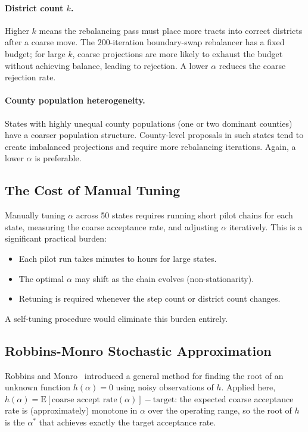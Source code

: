 \paragraph{District count $k$.}
Higher $k$ means the rebalancing pass must place more tracts into correct
districts after a coarse move.
The $200$-iteration boundary-swap rebalancer has a fixed budget; for large
$k$, coarse projections are more likely to exhaust the budget without
achieving balance, leading to rejection.
A lower $\alpha$ reduces the coarse rejection rate.

\paragraph{County population heterogeneity.}
States with highly unequal county populations (one or two dominant counties)
have a coarser population structure.
County-level proposals in such states tend to create imbalanced projections
and require more rebalancing iterations.
Again, a lower $\alpha$ is preferable.

\subsection{The Cost of Manual Tuning}

Manually tuning $\alpha$ across 50 states requires running short pilot chains
for each state, measuring the coarse acceptance rate, and adjusting $\alpha$
iteratively.
This is a significant practical burden:
\begin{itemize}
  \item Each pilot run takes minutes to hours for large states.
  \item The optimal $\alpha$ may shift as the chain evolves (non-stationarity).
  \item Retuning is required whenever the step count or district count changes.
\end{itemize}
A self-tuning procedure would eliminate this burden entirely.

\subsection{Robbins-Monro Stochastic Approximation}

Robbins and Monro~\citeyear{robbins1951} introduced a general method for
finding the root of an unknown function $h(\alpha) = 0$ using noisy
observations of $h$.
Applied here, $h(\alpha) = \mathrm{E}[\text{coarse accept rate}(\alpha)] - \text{target}$:
the expected coarse acceptance rate is (approximately) monotone in $\alpha$
over the operating range, so the root of $h$ is the $\alpha^*$ that achieves
exactly the target acceptance rate.

